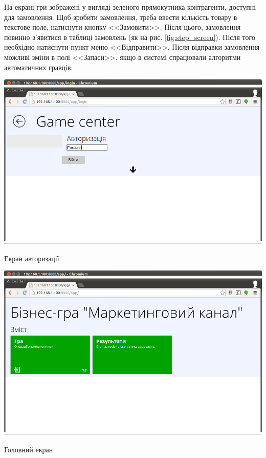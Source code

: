 На екрані гри зображені у вигляді зеленого прямокутника контрагенти, доступні для замовлення. Щоб зробити замовлення, треба ввести кількість товару в текстове поле, натиснути кнопку <<Замовити>>. Після цього, замовлення повинно з’явитися в таблиці замовлень (як на рис. \ref{fig:step_screen}). Після того необхідно натиснути пункт меню <<Відправити>>. Після відправки замовлення можливі зміни в полі <<Запаси>>, якщо в системі спрацювали алгоритми автоматичних гравців.
\begin{stdfigure}
    \includegraphics[width=7in]{images/screen/login_screen.png}
    \caption{Екран авторизації}
    \label{fig:login_screen}
\end{stdfigure}   
\begin{stdfigure}
    \includegraphics[width=7in]{images/screen/main_screen.png}
    \caption{Головний екран}
    \label{fig:main_screen}
\end{stdfigure}
